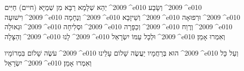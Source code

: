 \documentclass[12pt, a5paper, twoside, extrafontsizes]{memoir}
\renewcommand{\leadword}[1]{%
  \lettrine[lines=2]{#1}{}
}
\renewcommand{\hdot}{\textenglish{^^^^2009}^^^^e010 }
\newcommand{\para}[2]{\leadword{#1}#2}
\begin{document}
    \para{יְהֵא}{שְׁלָמָא רַבָּא מִן שְׁמַיָּא ({\smaller חיים}) חַיִּים\hdot וְשָׂבָע\hdot
      וִישׁוּעָה\hdot וְנֶחָמָה\hdot וְשֵׁיזָבָא\hdot וּרְפוּאָה\hdot
      וּגְאוּלָה\hdot וּסְלִיחָה\hdot וְכַפָּרָה\hdot וְרֶוַח\hdot וְהַצָּלָה\hdot
      לָנוּ\hdot וּלְכָל עַמּוֹ יִשְׂרָאֵל\hdot וְאִמְרוּ אָמֵן׃}

    עֹשֶׂה שָׁלוֹם בִּמְרוֹמָיו\hdot הוּא בְּרַחֲמָיו יַעֲשֶׂה שָׁלוֹם עָלֵינוּ\hdot
    וְעַל כָּל יִשְׂרָאֵל\hdot וְאִמְרוּ אָמֵן׃
\end{document}
